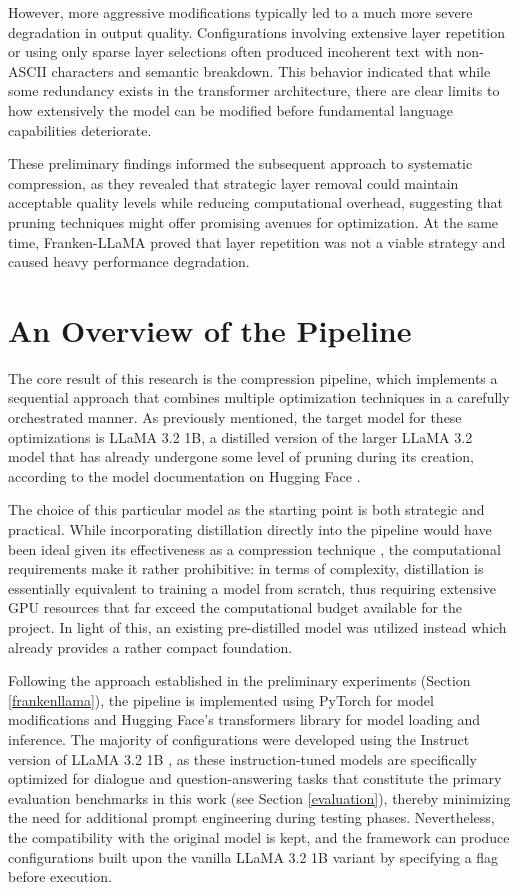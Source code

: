 However, more aggressive modifications typically led to a much more severe degradation in output quality. Configurations involving extensive layer repetition or using only sparse layer selections often produced incoherent text with non-ASCII characters and semantic breakdown. This behavior indicated that while some redundancy exists in the transformer architecture, there are clear limits to how extensively the model can be modified before fundamental language capabilities deteriorate.

These preliminary findings informed the subsequent approach to systematic compression, as they revealed that strategic layer removal could maintain acceptable quality levels while reducing computational overhead, suggesting that pruning techniques might offer promising avenues for optimization. At the same time, Franken-LLaMA proved that layer repetition was not a viable strategy and caused heavy performance degradation.

\section{An Overview of the Pipeline}

The core result of this research is the compression pipeline, which implements a sequential approach that combines multiple optimization techniques in a carefully orchestrated manner. As previously mentioned, the target model for these optimizations is LLaMA 3.2 1B, a distilled version of the larger LLaMA 3.2 model that has already undergone some level of pruning during its creation, according to the model documentation on Hugging Face \cite{llama3_1b}.

The choice of this particular model as the starting point is both strategic and practical. While incorporating distillation directly into the pipeline would have been ideal given its effectiveness as a compression technique \cite{homodistil}, the computational requirements make it rather prohibitive: in terms of complexity, distillation is essentially equivalent to training a model from scratch, thus requiring extensive GPU resources that far exceed the computational budget available for the project. In light of this, an existing pre-distilled model was utilized instead which already provides a rather compact foundation.

Following the approach established in the preliminary experiments (Section \ref{frankenllama}), the pipeline is implemented using PyTorch \cite{pytorch} for model modifications and Hugging Face's transformers library \cite{hf_transformers} for model loading and inference. The majority of configurations were developed using the Instruct version of LLaMA 3.2 1B \cite{llama3_1b_instruct}, as these instruction-tuned models are specifically optimized for dialogue and question-answering tasks that constitute the primary evaluation benchmarks in this work (see Section \ref{evaluation}), thereby minimizing the need for additional prompt engineering during testing phases. Nevertheless, the compatibility with the original model is kept, and the framework can produce configurations built upon the vanilla LLaMA 3.2 1B variant \cite{llama3_1b} by specifying a flag before execution.

